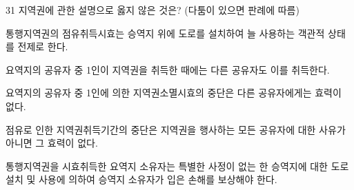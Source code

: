 \begin{question}{31}
지역권에 관한 설명으로 옳지 않은 것은? (다툼이 있으면 판례에 따름)
\begin{choices}
  \item 통행지역권의 점유취득시효는 승역지 위에 도로를 설치하여 늘 사용하는 객관적 상태를 전제로 한다.
  \item 요역지의 공유자 중 1인이 지역권을 취득한 때에는 다른 공유자도 이를 취득한다.
  \item 요역지의 공유자 중 1인에 의한 지역권소멸시효의 중단은 다른 공유자에게는 효력이 없다.
  \item 점유로 인한 지역권취득기간의 중단은 지역권을 행사하는 모든 공유자에 대한 사유가 아니면 그 효력이 없다.
  \item 통행지역권을 시효취득한 요역지 소유자는 특별한 사정이 없는 한 승역지에 대한 도로 설치 및 사용에 의하여 승역지 소유자가 입은 손해를 보상해야 한다.
\end{choices}
\end{question}

